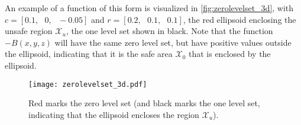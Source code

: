 An example of a function of this form is visualized in \autoref{fig:zerolevelset_3d}, with $c= [0.1,\,\,\,\, 0,\,\,\,\, -0.05]$ and $r=[0.2,\,\,\,\, 0.1,\,\,\,\, 0.1]$, the red ellipsoid enclosing the unsafe region $\mathcal{X}_u$, the one level set shown in black. Note that the function $-B(x,y,z)$ will have the same zero level set, but have positive values outside the ellipsoid, indicating that it is the safe area $\mathcal{X}_0$ that is enclosed by the ellipsoid.

\begin{figure}[htbp]
	\centering
	\hspace*{-15mm}
	\texttt{[image: zerolevelset\_3d.pdf]}
	\caption{Red marks the zero level set (and black marks the one level set, indicating that the ellipsoid encloses the region $\mathcal{X}_u$).}
	\label{fig:zerolevelset_3d}
\end{figure}

